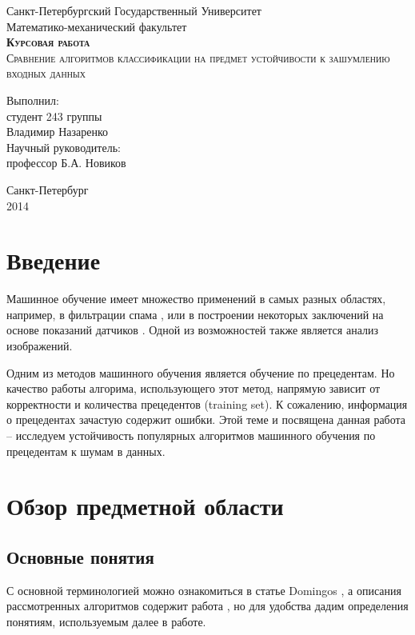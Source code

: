 \documentclass{article}
\begin{document}
\begin{titlepage}

\begin{center}
Санкт-Петербургский Государственный Университет\\
Математико-механический факультет\\
\vspace{12em}
\textsc{\textbf{Курсовая работа\\}Сравнение алгоритмов классификации на предмет устойчивости к зашумлению входных данных}
\end{center}
\vspace{10em}
\begin{flushright}
Выполнил:\\
студент 243 группы\\
Владимир Назаренко\\
\vspace{1em}
Научный руководитель:\\
профессор Б.А. Новиков
\end{flushright}
\vspace{\fill}
\center
Санкт-Петербург\\2014
\end{titlepage}



\section{Введение}
Машинное обучение имеет множество применений в самых разных областях, например, в фильтрации спама \cite{spamFiltering}, или в построении некоторых заключений на основе показаний датчиков \cite{sensors}. Одной из возможностей также является анализ изображений.

Одним из методов машинного обучения является обучение по прецедентам.
Но качество работы алгорима, использующего этот метод, напрямую зависит от корректности и количества прецедентов (training set). К сожалению, информация о прецедентах зачастую содержит ошибки. Этой теме и посвящена данная работа -- исследуем устойчивость популярных алгоритмов машинного обучения по прецедентам к шумам в данных.






\section{Обзор предметной области}
\subsection{Основные понятия}
С основной терминологией можно ознакомиться в статье Domingos \cite{fewUseful}, а описания рассмотренных алгоритмов содержит работа \cite{wu2008top}, но для удобства дадим определения понятиям, используемым далее в работе. 
\end{document}
